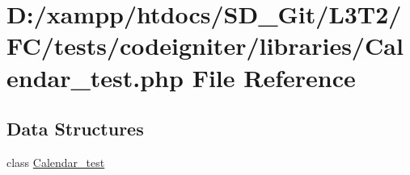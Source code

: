 \hypertarget{_calendar__test_8php}{}\section{D\+:/xampp/htdocs/\+S\+D\+\_\+\+Git/\+L3\+T2/\+F\+C/tests/codeigniter/libraries/\+Calendar\+\_\+test.php File Reference}
\label{_calendar__test_8php}
\subsection*{Data Structures}
\begin{DoxyCompactItemize}
\item 
class \hyperlink{class_calendar__test}{Calendar\+\_\+test}
\end{DoxyCompactItemize}
